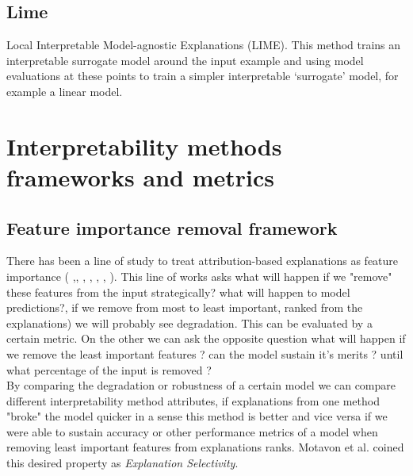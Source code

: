 \documentclass[12pt]{report}
\begin{document}
\subsection{Lime}

Local Interpretable Model-agnostic Explanations \cite{DBLP:journals/corr/RibeiroSG16} (LIME). This method trains an interpretable surrogate model around the input example and using model evaluations at these points to train a simpler interpretable ‘surrogate’ model, for example a linear model.

\newpage

\section{Interpretability methods frameworks and metrics}

\subsection{Feature importance removal framework}

There has been a line of study to treat attribution-based explanations as feature importance (\cite{https://doi.org/10.48550/arxiv.1509.06321} \cite{https://doi.org/10.48550/arxiv.1806.10758} \cite{DBLP:journals/corr/MontavonSM17},\cite{LRP},  \cite{DBLP:journals/corr/ArrasHMMS16a}, \cite{DBLP:journals/corr/abs-1911-03429}, \cite{DBLP:journals/corr/abs-1905-04610}, \cite{DBLP:journals/corr/abs-1904-11829}, \cite{nguyen-2018-comparing}).  This line of works asks what will happen if we "remove" these features from the input strategically?  what will happen to model predictions?, if we remove from most to least important, ranked from the explanations) we will probably see degradation. This can be evaluated by a certain metric. On the other we can ask the opposite question what will happen if we remove the least important features ? can the model sustain it's merits ? until what percentage of the input is removed ? \\

By comparing the degradation or robustness of a certain model we can compare different interpretability method attributes, if explanations from one method "broke" the model quicker in a sense this method is better and vice versa if we were able to sustain accuracy or other performance metrics of a model when removing least important features from explanations ranks. Motavon et al. \cite{DBLP:journals/corr/MontavonSM17} coined this desired property as \textit{Explanation Selectivity}.\\
\end{document}
